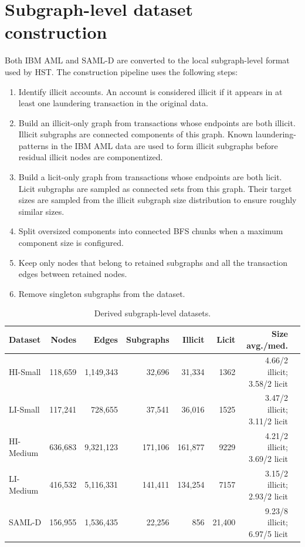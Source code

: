 \documentclass[12pt, twocolumn]{report}
\begin{document}
\section{Subgraph-level dataset construction}

Both IBM AML and SAML-D are converted to the local subgraph-level format used by HST. The construction pipeline uses the following steps:
\begin{enumerate}
    \item Identify illicit accounts. An account is considered illicit if it appears in at least one laundering transaction in the original data.
    \item Build an illicit-only graph from transactions whose endpoints are both illicit. Illicit subgraphs are connected components of this graph. Known laundering-patterns in the IBM AML data are used to form illicit subgraphs before residual illicit nodes are componentized.
    \item Build a licit-only graph from transactions whose endpoints are both licit. Licit subgraphs are sampled as connected sets from this graph. Their target sizes are sampled from the illicit subgraph size distribution to ensure roughly similar sizes.
    \item Split oversized components into connected BFS chunks when a maximum component size is configured.
    \item Keep only nodes that belong to retained subgraphs and all the transaction edges between retained nodes.
    \item Remove singleton subgraphs from the dataset.
\end{enumerate}

\begin{table}[t]
    \centering
    \caption{Derived subgraph-level datasets.}
    \label{tab:derived-dataset-stats}
    \footnotesize
    \begin{tabular}{lrrrrrrr}
        \hline
        Dataset & Nodes & Edges & Subgraphs & Illicit & Licit & Size avg./med. \\
        \hline
        HI-Small  & 118,659 & 1,149,343 & 32,696 & 31,334 & 1362 & 4.66/2 illicit; 3.58/2 licit \\
        LI-Small & 117,241 & 728,655 & 37,541 & 36,016 & 1525 & 3.47/2 illicit; 3.11/2 licit \\
        HI-Medium & 636,683 & 9,321,123 & 171,106 & 161,877 & 9229 & 4.21/2 illicit; 3.69/2 licit \\
        LI-Medium & 416,532 & 5,116,331 & 141,411 & 134,254 & 7157 & 3.15/2 illicit; 2.93/2 licit \\
        SAML-D & 156,955 & 1,536,435 & 22,256 & 856 & 21,400 & 9.23/8 illicit; 6.97/5 licit \\
        \hline
    \end{tabular}
\end{table}
\end{document}
